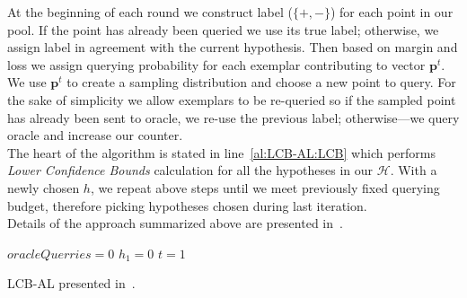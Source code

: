 \documentclass[12pt, a4paper, pdflatex, leqno, twoside]{report}
\begin{document}
At the beginning of each round we construct label ($\{+, -\}$) for each point 
in our pool. If the point has already been queried we use its true label; otherwise, 
 we assign label in agreement with the current hypothesis. Then based on 
margin and loss we assign querying probability for each exemplar contributing 
to vector $\mathbf{p}^t$. We use $\mathbf{p}^t$ to create a sampling 
distribution and choose a new point to query. For the sake of simplicity we allow 
exemplars to be re-queried so if the sampled point has already been sent to 
oracle, we re-use the previous label; otherwise---we query oracle and increase our 
counter.\\

The heart of the algorithm is stated in line~\ref{al:LCB-AL:LCB} which performs 
\emph{Lower Confidence Bounds} calculation for all the hypotheses in our 
$\mathscr{H}$. With a newly chosen $h$, we repeat above steps until we meet 
previously fixed querying budget, therefore picking hypotheses chosen during last 
iteration.\\

Details of the approach summarized above are presented 
in~\citep{DBLP:journals/corr/GantiG13}.\\

\vspace{2cm}
\begin{algorithm}[H]
 \LinesNumbered
 $oracleQuerries = 0$\;
 $h_1 = 0$\;
 $t = 1$\;
 \caption{LCB-AL presented in~\citep{DBLP:journals/corr/GantiG13}.\label{al:LCB-AL}}
\end{algorithm}
\vspace{2cm}
\end{document}
